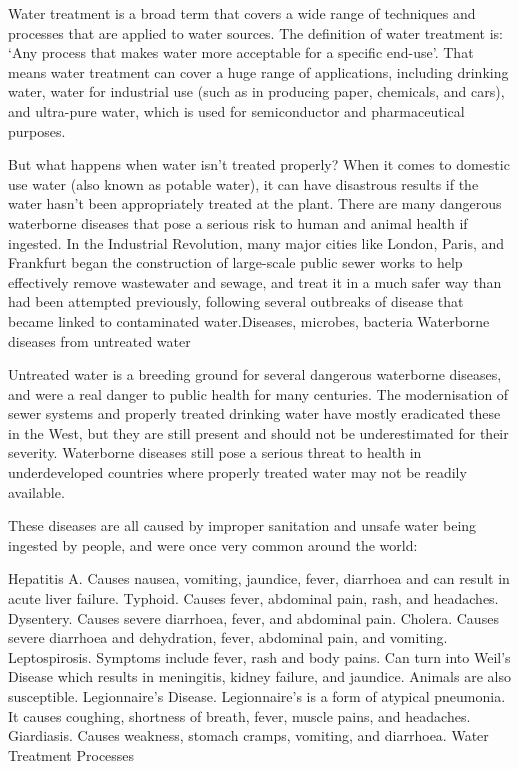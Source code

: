 \documentclass{article}
\begin{document}
Water treatment is a broad term that covers a wide range of techniques and processes that are applied to water sources. The definition of water treatment is: ‘Any process that makes water more acceptable for a specific end-use’. That means water treatment can cover a huge range of applications, including drinking water, water for industrial use (such as in producing paper, chemicals, and cars), and ultra-pure water, which is used for semiconductor and pharmaceutical purposes.

But what happens when water isn’t treated properly? When it comes to domestic use water (also known as potable water), it can have disastrous results if the water hasn’t been appropriately treated at the plant. There are many dangerous waterborne diseases that pose a serious risk to human and animal health if ingested. In the Industrial Revolution, many major cities like London, Paris, and Frankfurt began the construction of large-scale public sewer works to help effectively remove wastewater and sewage, and treat it in a much safer way than had been attempted previously, following several outbreaks of disease that became linked to contaminated water.Diseases, microbes, bacteria
Waterborne diseases from untreated water

Untreated water is a breeding ground for several dangerous waterborne diseases, and were a real danger to public health for many centuries. The modernisation of sewer systems and properly treated drinking water have mostly eradicated these in the West, but they are still present and should not be underestimated for their severity. Waterborne diseases still pose a serious threat to health in underdeveloped countries where properly treated water may not be readily available.

These diseases are all caused by improper sanitation and unsafe water being ingested by people, and were once very common around the world:

Hepatitis A. Causes nausea, vomiting, jaundice, fever, diarrhoea and can result in acute liver failure.
Typhoid. Causes fever, abdominal pain, rash, and headaches.
Dysentery. Causes severe diarrhoea, fever, and abdominal pain.
Cholera. Causes severe diarrhoea and dehydration, fever, abdominal pain, and vomiting.
Leptospirosis. Symptoms include fever, rash and body pains. Can turn into Weil’s Disease which results in meningitis, kidney failure, and jaundice. Animals are also susceptible.
Legionnaire’s Disease. Legionnaire’s is a form of atypical pneumonia. It causes coughing, shortness of breath, fever, muscle pains, and headaches.
Giardiasis. Causes weakness, stomach cramps, vomiting, and diarrhoea.
Water Treatment Processes
\end{document}
